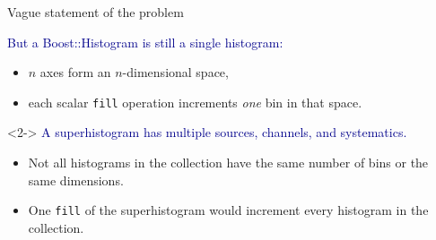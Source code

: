 \documentclass[aspectratio=169]{beamer}
\begin{document}
\begin{frame}{Vague statement of the problem}
\vspace{0.5 cm}
\Large

\textcolor{darkblue}{But a Boost::Histogram is still a single histogram:}

\vspace{0.25 cm}
\begin{itemize}
\item $n$ axes form an $n$-dimensional space,
\item each scalar \texttt{fill} operation increments {\it one} bin in that space.
\end{itemize}

\vspace{0.75 cm}
\begin{uncoverenv}<2->
\textcolor{darkblue}{A superhistogram has multiple sources, channels, and systematics.}

\vspace{0.25 cm}
\begin{itemize}
\item Not all histograms in the collection have the same number of bins or the same dimensions.
\item One \texttt{fill} of the superhistogram would increment every histogram in the collection.
\end{itemize}
\end{uncoverenv}
\end{frame}
\end{document}

